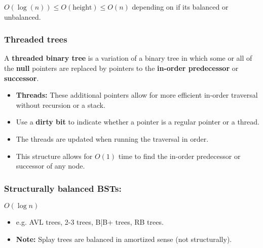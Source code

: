 \begin{warning}
    $O(\log(n)) \leq O(\text{height}) \leq O(n)$ depending on if its balanced or unbalanced. 
\end{warning}

\subsubsection{Threaded trees}
\begin{definition}
    A \textbf{threaded binary tree} is a variation of a binary tree in which some or all of the \textbf{null} pointers are replaced by pointers to the \textbf{in-order predecessor} or \textbf{successor}. 

    \begin{itemize}
        \item \textbf{Threads:} These additional pointers allow for more efficient in-order traversal without recursion or a stack.
        \item Use a \textbf{dirty bit} to indicate whether a pointer is a regular pointer or a thread.
        \item The threads are updated when running the traversal in order.
        \item This structure allows for $O(1)$ time to find the in-order predecessor or successor of any node.
    \end{itemize}
\end{definition}

\begin{example}
\end{example}

\subsubsection{Structurally balanced BSTs:}
\begin{definition}
    $O(\log n)$
    \begin{itemize}
        \item e.g. AVL trees, 2-3 trees, B|B+ trees, RB trees.
        \item \textbf{Note:} Splay trees are balanced in amortized sense (not structurally).
    \end{itemize}
\end{definition}


